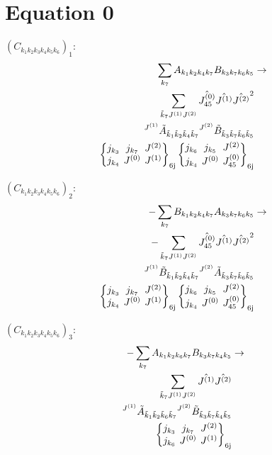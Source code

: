 \documentclass[11pt]{article}
\newcommand{\sixj}[6]{\begingroup\setlength{\arraycolsep}{0.2em}\begin{Bmatrix} #1 & #2 & #3 \\ #4 & #5 & #6 \end{Bmatrix}_{\text{6j}}\endgroup}
\begin{document}
\section{Equation 0}
$\left({C}_{{k}_{1}{k}_{2}{k}_{3}{k}_{4}{k}_{5}{k}_{6}}\right)_{1}$:
\begin{align}
\sum_{{k}_{7}}{A}_{{k}_{1}{k}_{2}{k}_{4}{k}_{7}}{B}_{{k}_{3}{k}_{7}{k}_{6}{k}_{5}}&\rightarrow \notag \\\sum_{\tilde{k}_{7}J^{(1)}J^{(2)}}\hat{J^{(0)}_{45}}\hat{J^{(1)}}\hat{J^{(2)}}^{2}& \notag \\{}^{J^{(1)}}\tilde{A}_{\tilde{k}_{1}\tilde{k}_{2}\tilde{k}_{4}\tilde{k}_{7}}{}^{J^{(2)}}\tilde{B}_{\tilde{k}_{3}\tilde{k}_{7}\tilde{k}_{6}\tilde{k}_{5}}& \notag \\\sixj{j_{{k}_{3}}}{j_{{k}_{7}}}{J^{(2)}}{j_{{k}_{4}}}{J^{(0)}}{J^{(1)}}\sixj{j_{{k}_{6}}}{j_{{k}_{5}}}{J^{(2)}}{j_{{k}_{4}}}{J^{(0)}}{J^{(0)}_{45}}
\end{align}

$\left({C}_{{k}_{1}{k}_{2}{k}_{3}{k}_{4}{k}_{5}{k}_{6}}\right)_{2}$:
\begin{align}
-\sum_{{k}_{7}}{B}_{{k}_{1}{k}_{2}{k}_{4}{k}_{7}}{A}_{{k}_{3}{k}_{7}{k}_{6}{k}_{5}}&\rightarrow \notag \\-\sum_{\tilde{k}_{7}J^{(1)}J^{(2)}}\hat{J^{(0)}_{45}}\hat{J^{(1)}}\hat{J^{(2)}}^{2}& \notag \\{}^{J^{(1)}}\tilde{B}_{\tilde{k}_{1}\tilde{k}_{2}\tilde{k}_{4}\tilde{k}_{7}}{}^{J^{(2)}}\tilde{A}_{\tilde{k}_{3}\tilde{k}_{7}\tilde{k}_{6}\tilde{k}_{5}}& \notag \\\sixj{j_{{k}_{3}}}{j_{{k}_{7}}}{J^{(2)}}{j_{{k}_{4}}}{J^{(0)}}{J^{(1)}}\sixj{j_{{k}_{6}}}{j_{{k}_{5}}}{J^{(2)}}{j_{{k}_{4}}}{J^{(0)}}{J^{(0)}_{45}}
\end{align}

$\left({C}_{{k}_{1}{k}_{2}{k}_{3}{k}_{4}{k}_{5}{k}_{6}}\right)_{3}$:
\begin{align}
-\sum_{{k}_{7}}{A}_{{k}_{1}{k}_{2}{k}_{6}{k}_{7}}{B}_{{k}_{3}{k}_{7}{k}_{4}{k}_{5}}&\rightarrow \notag \\\sum_{\tilde{k}_{7}J^{(1)}J^{(2)}}\hat{J^{(1)}}\hat{J^{(2)}}& \notag \\{}^{J^{(1)}}\tilde{A}_{\tilde{k}_{1}\tilde{k}_{2}\tilde{k}_{6}\tilde{k}_{7}}{}^{J^{(2)}}\tilde{B}_{\tilde{k}_{3}\tilde{k}_{7}\tilde{k}_{4}\tilde{k}_{5}}& \notag \\\sixj{j_{{k}_{3}}}{j_{{k}_{7}}}{J^{(2)}}{j_{{k}_{6}}}{J^{(0)}}{J^{(1)}}
\end{align}
\end{document}
